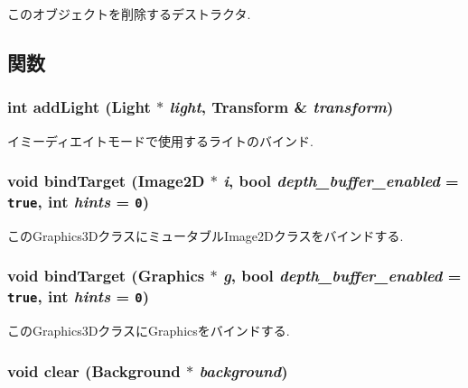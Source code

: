 このオブジェクトを削除するデストラクタ. 

\subsection{関数}
\hypertarget{classm3g_1_1Graphics3D_e210cacb72c8540df86a6674e3c2dc4f}{
\subsubsection[{addLight}]{\setlength{\rightskip}{0pt plus 5cm}int addLight ({\bf Light} $\ast$ {\em light}, \/  {\bf Transform} \& {\em transform})}}
\label{classm3g_1_1Graphics3D_e210cacb72c8540df86a6674e3c2dc4f}


イミーディエイトモードで使用するライトのバインド. \hypertarget{classm3g_1_1Graphics3D_e3640472397d2b632496fa37c990b4bb}{
\subsubsection[{bindTarget}]{\setlength{\rightskip}{0pt plus 5cm}void bindTarget ({\bf Image2D} $\ast$ {\em i}, \/  bool {\em depth\_\-buffer\_\-enabled} = {\tt true}, \/  int {\em hints} = {\tt 0})}}
\label{classm3g_1_1Graphics3D_e3640472397d2b632496fa37c990b4bb}


このGraphics3DクラスにミュータブルImage2Dクラスをバインドする. \hypertarget{classm3g_1_1Graphics3D_2173e179f4b2d7130cde46a48794ee66}{
\subsubsection[{bindTarget}]{\setlength{\rightskip}{0pt plus 5cm}void bindTarget ({\bf Graphics} $\ast$ {\em g}, \/  bool {\em depth\_\-buffer\_\-enabled} = {\tt true}, \/  int {\em hints} = {\tt 0})}}
\label{classm3g_1_1Graphics3D_2173e179f4b2d7130cde46a48794ee66}


このGraphics3DクラスにGraphicsをバインドする. \hypertarget{classm3g_1_1Graphics3D_21c4a68a53cfbe0a7cec05d5a56682bf}{
\subsubsection[{clear}]{\setlength{\rightskip}{0pt plus 5cm}void clear ({\bf Background} $\ast$ {\em background})}}
\label{classm3g_1_1Graphics3D_21c4a68a53cfbe0a7cec05d5a56682bf}


